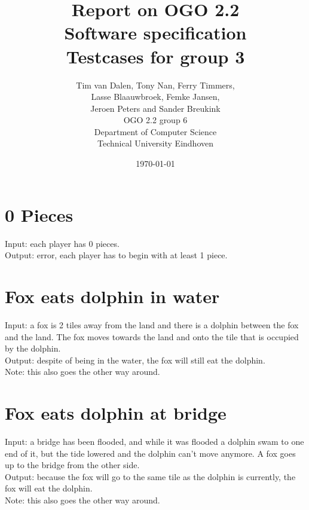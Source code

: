 \documentclass[a4paper,11pt]{article}
\title{Report on OGO 2.2 \\ Software specification\\ Testcases for group 3}
\author{
        Tim van Dalen, Tony Nan, Ferry Timmers, \\ Lasse Blaauwbroek, Femke Jansen, \\Jeroen Peters and Sander Breukink\\ OGO 2.2 group 6 \\
                Department of Computer Science\\
        Technical University Eindhoven\\
}
\date{\today}
\begin{document}
\maketitle
	
	\section{0 Pieces}
    Input: each player has 0 pieces.\\
    Output: error, each player has to begin with at least 1 piece.

	\section{Fox eats dolphin in water}
    Input: a fox is 2 tiles away from the land and there is a dolphin between the fox and the land. The fox moves towards the land and onto the tile that is occupied by the dolphin.\\
    Output: despite of being in the water, the fox will still eat the dolphin.\\
    Note: this also goes the other way around.\\
    
    \section{Fox eats dolphin at bridge}
    Input: a bridge has been flooded, and while it was flooded a dolphin swam to one end of it, but the tide lowered and the dolphin can't move anymore. A fox goes up to the bridge from the other side.\\
    Output: because the fox will go to the same tile as the dolphin is currently, the fox will eat the dolphin.\\
    Note: this also goes the other way around.\\
\end{document}
